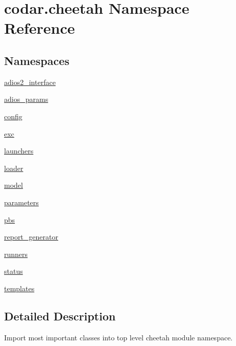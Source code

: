 \hypertarget{namespacecodar_1_1cheetah}{}\section{codar.\+cheetah Namespace Reference}
\label{namespacecodar_1_1cheetah}
\subsection*{Namespaces}
\begin{DoxyCompactItemize}
\item 
 \hyperlink{namespacecodar_1_1cheetah_1_1adios2__interface}{adios2\+\_\+interface}
\item 
 \hyperlink{namespacecodar_1_1cheetah_1_1adios__params}{adios\+\_\+params}
\item 
 \hyperlink{namespacecodar_1_1cheetah_1_1config}{config}
\item 
 \hyperlink{namespacecodar_1_1cheetah_1_1exc}{exc}
\item 
 \hyperlink{namespacecodar_1_1cheetah_1_1launchers}{launchers}
\item 
 \hyperlink{namespacecodar_1_1cheetah_1_1loader}{loader}
\item 
 \hyperlink{namespacecodar_1_1cheetah_1_1model}{model}
\item 
 \hyperlink{namespacecodar_1_1cheetah_1_1parameters}{parameters}
\item 
 \hyperlink{namespacecodar_1_1cheetah_1_1pbs}{pbs}
\item 
 \hyperlink{namespacecodar_1_1cheetah_1_1report__generator}{report\+\_\+generator}
\item 
 \hyperlink{namespacecodar_1_1cheetah_1_1runners}{runners}
\item 
 \hyperlink{namespacecodar_1_1cheetah_1_1status}{status}
\item 
 \hyperlink{namespacecodar_1_1cheetah_1_1templates}{templates}
\end{DoxyCompactItemize}


\subsection{Detailed Description}
\begin{DoxyVerb}Import most important classes into top level cheetah module namespace.
\end{DoxyVerb}
 